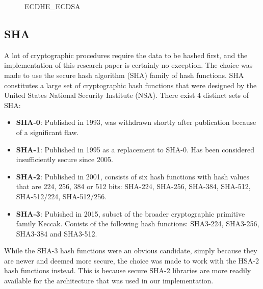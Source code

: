 \begin{figure}[h]
	\centering
	\caption{ECDHE\_ECDSA}
	\label{fig:ECDH2}
\end{figure} 

\subsection{SHA} 
\label{subsec:sha}

A lot of cryptographic procedures require the data to be hashed first, and the implementation of this research paper is certainly no exception. The choice was made to use the secure hash algorithm (SHA) family of hash functions. SHA constitutes a large set of cryptographic hash functions that were designed by the United States National Security Institute (NSA). There exist 4 distinct sets of SHA\cite{wiki:SHA}:

\begin{itemize}
	\item \textbf{SHA-0}: Published in 1993, was withdrawn shortly after publication because of a significant flaw.
	
	\item \textbf{SHA-1}: Published in 1995 as a replacement to SHA-0. Has been considered insufficiently secure since 2005.
	
	\item \textbf{SHA-2}: Published in 2001, consists of six hash functions with hash values that are 224, 256, 384 or 512 bits: SHA-224, SHA-256, SHA-384, SHA-512, SHA-512/224, SHA-512/256.
	
	\item \textbf{SHA-3}: Pubished in 2015, subset of the broader cryptographic primitive family Keccak. Conists of the following hash functions: SHA3-224, SHA3-256, SHA3-384 and SHA3-512.
\end{itemize} 
While the SHA-3 hash functions were an obvious candidate, simply because they are newer and deemed more secure, the choice was made to work with the HSA-2 hash functions instead. This is because secure SHA-2 libraries are more readily available for the architecture that was used in our implementation. 

